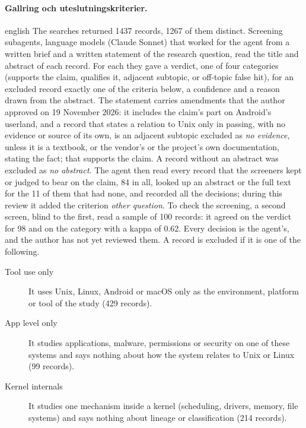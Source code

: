 \paragraph{%
  {Gallring och uteslutningskriterier.}} %
\begin{onlyin}{english} %
The searches returned 1437 records, 1267 of them distinct.
Screening subagents, language models (Claude Sonnet) that worked for
the agent from a written brief and a written statement of the research
question, read the title and abstract of each record.  For each they
gave a verdict, one of four categories (supports the claim, qualifies
it, adjacent subtopic, or off-topic false hit), for an excluded record
exactly one of the criteria below, a confidence and a reason drawn from
the abstract.  The statement carries amendments that the author
approved on 19 November 2026: it includes the claim's part on Android's
userland, and a record that states a relation to Unix only in passing,
with no evidence or source of its own, is an adjacent subtopic excluded
as \emph{no evidence}, unless it is a textbook, or the vendor's or the
project's own documentation, stating the fact; that supports the claim.
A record without an abstract was excluded as \emph{no abstract}.  The
agent then read every record that the screeners kept or judged to bear
on the claim, 84 in all, looked up an abstract or the full text for
the 11 of them that had none, and recorded all the decisions; during
this review it added the criterion \emph{other question}.  To check
the screening, a second screen, blind to the first, read a sample of
100 records: it agreed on the verdict for 98 and on the category with a
kappa of 0.62.  Every decision is the agent's, and the author has not
yet reviewed them.  A record is excluded if it is one of the following.
\begin{description}
  \item[Tool use only] It uses Unix, Linux, Android or macOS only as the
    environment, platform or tool of the study (429 records).
  \item[App level only] It studies applications, malware, permissions or
    security on one of these systems and says nothing about how the
    system relates to Unix or Linux (99 records).
  \item[Kernel internals] It studies one mechanism inside a kernel
    (scheduling, drivers, memory, file systems) and says nothing about
    lineage or classification (214 records).

\end{description}
\end{onlyin}

